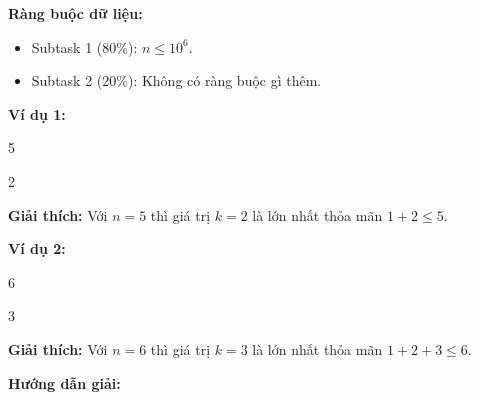 \documentclass[12pt]{scrartcl}  %
\begin{document}
\textbf{Ràng buộc dữ liệu:}
\begin{itemize}
    \item Subtask 1 (80\%): $n \leq 10^6$.
    \item Subtask 2 (20\%): Không có ràng buộc gì thêm.
\end{itemize}

\textbf{Ví dụ 1:}
\begin{tcolorbox}[colback=gray!5!white, colframe=blue!50!black, title=Input]
5
\end{tcolorbox}
\begin{tcolorbox}[colback=gray!5!white, colframe=green!50!black, title=Output]
2
\end{tcolorbox}

\textbf{Giải thích:}
Với $n = 5$ thì giá trị $k = 2$ là lớn nhất thỏa mãn $1 + 2 \leq 5$.

\textbf{Ví dụ 2:}
\begin{tcolorbox}[colback=gray!5!white, colframe=blue!50!black, title=Input]
6
\end{tcolorbox}
\begin{tcolorbox}[colback=gray!5!white, colframe=green!50!black, title=Output]
3
\end{tcolorbox}

\textbf{Giải thích:}
Với $n = 6$ thì giá trị $k = 3$ là lớn nhất thỏa mãn $1 + 2 + 3 \leq 6$.

\textbf{Hướng dẫn giải:}
\end{document}
